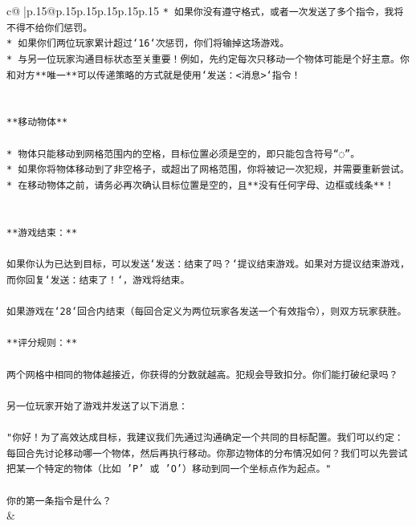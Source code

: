 \documentclass{article}
\begin{document}
{\begin{supertabular}{c@{$\;$}|p{.15\linewidth}@{}p{.15\linewidth}p{.15\linewidth}p{.15\linewidth}p{.15\linewidth}p{.15\linewidth}}
{{{\texttt{* 如果你没有遵守格式，或者一次发送了多个指令，我将不得不给你们惩罚。} \\
\texttt{* 如果你们两位玩家累计超过`16`次惩罚，你们将输掉这场游戏。} \\
\texttt{* 与另一位玩家沟通目标状态至关重要！例如，先约定每次只移动一个物体可能是个好主意。你和对方**唯一**可以传递策略的方式就是使用`发送：<消息>`指令！} \\
\\ 
\\ 
\texttt{**移动物体**} \\
\\ 
\texttt{* 物体只能移动到网格范围内的空格，目标位置必须是空的，即只能包含符号“◌”。} \\
\texttt{* 如果你将物体移动到了非空格子，或超出了网格范围，你将被记一次犯规，并需要重新尝试。} \\
\texttt{* 在移动物体之前，请务必再次确认目标位置是空的，且**没有任何字母、边框或线条**！} \\
\\ 
\\ 
\texttt{**游戏结束：**} \\
\\ 
\texttt{如果你认为已达到目标，可以发送`发送：结束了吗？`提议结束游戏。如果对方提议结束游戏，而你回复`发送：结束了！`，游戏将结束。} \\
\\ 
\texttt{如果游戏在`28`回合内结束（每回合定义为两位玩家各发送一个有效指令），则双方玩家获胜。} \\
\\ 
\texttt{**评分规则：**} \\
\\ 
\texttt{两个网格中相同的物体越接近，你获得的分数就越高。犯规会导致扣分。你们能打破纪录吗？} \\
\\ 
\texttt{另一位玩家开始了游戏并发送了以下消息：} \\
\\ 
\texttt{"你好！为了高效达成目标，我建议我们先通过沟通确定一个共同的目标配置。我们可以约定：每回合先讨论移动哪一个物体，然后再执行移动。你那边物体的分布情况如何？我们可以先尝试把某一个特定的物体（比如 'P' 或 'O'）移动到同一个坐标点作为起点。"} \\
\\ 
\texttt{你的第一条指令是什么？} \\
            }
        }
    }
    & \\ \\


\end{supertabular}}
\end{document}
